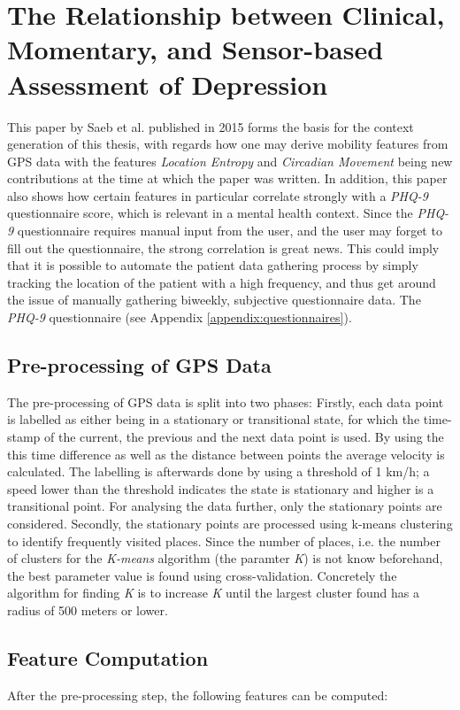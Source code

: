 \section{The Relationship between Clinical, Momentary, and Sensor-based Assessment of Depression}
This paper by Saeb et al. published in 2015 \cite{Saeb2015} forms the basis for the context generation of this thesis, with regards how one may derive mobility features from GPS data with the features \textit{Location Entropy} and \textit{Circadian Movement} being new contributions at the time at which the paper was written. In addition, this paper also shows how certain features in particular correlate strongly with a \textit{PHQ-9} questionnaire score, which is relevant in a mental health context. Since the \textit{PHQ-9} questionnaire requires manual input from the user, and the user may forget to fill out the questionnaire, the strong correlation is great news. This could imply that it is possible to automate the patient data gathering process by simply tracking the location of the patient with a high frequency, and thus get around the issue of manually gathering biweekly, subjective questionnaire data. The \textit{PHQ-9} questionnaire (see Appendix \ref{appendix:questionnaires}).

\subsection{Pre-processing of GPS Data}
The pre-processing of GPS data is split into two phases:  Firstly, each data point is labelled as either being in a stationary or transitional state, for which the time-stamp of the current, the previous and the next data point is used. By using the this time difference as well as the distance between points the average velocity is calculated. The labelling is afterwards done by using a threshold of 1 km/h; a speed lower than the threshold indicates the state is stationary and higher is a transitional point. For analysing the data further, only the stationary points are considered. Secondly, the stationary points are processed using k-means clustering to identify frequently visited places. Since the number of places, i.e. the number of clusters for the \textit{K-means} algorithm (the paramter \textit{K}) is not know beforehand, the best parameter value is found using cross-validation. Concretely the algorithm for finding \textit{K} is to increase \textit{K} until the largest cluster found has a radius of 500 meters or lower.

\subsection{Feature Computation}
\label{ref:features-saeb2015}
After the pre-processing step, the following features can be computed:\\

